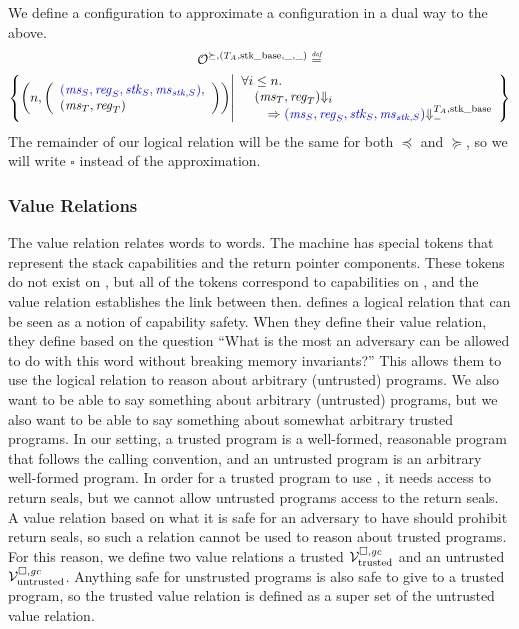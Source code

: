 \begin{jversion}
We define a \trgcm{} configuration to approximate a \srccm{} configuration in a dual way to the above.
\begin{multline*}
  \lro[\succeq,(\ta,\stkb,\_,\_)] \defeq \\\left\{ \npair{\left(\array{l}\src{(\ms_S,\reg_S,\stk_S,\ms_{\stk,S})},\\(\ms_T,\reg_T)\endarray\right)} \middle|
    \begin{array}{l}
      \forall i \leq n \ldotp \\ 
      \quad (\ms_T ,\reg_T) \term[i] \\\qquad\Rightarrow \src{(\ms_S,\reg_S,\stk_S,\ms_{\stk,S})} \sterm{\ta,\stkb}
    \end{array}
\right\}
\end{multline*}
The remainder of our logical relation will be the same for both $\preceq$ and $\succeq$, so we will write $\square$ instead of the approximation.

\subsubsection{Value Relations}
The value relation relates \trgcm{} words to \srccm{} words.
The \srccm{} machine has special tokens that represent the stack capabilities and the return pointer components.
These tokens do not exist on \trgcm{}, but all of the tokens correspond to capabilities on \trgcm{}, and the value relation establishes the link between then.
\citet{skorstengaard_reasoning_2017} defines a logical relation that can be seen as a notion of capability safety.
When they define their value relation, they define based on the question ``What is the most an adversary can be allowed to do with this word without breaking memory invariants?''
This allows them to use the logical relation to reason about arbitrary (untrusted) programs.
We also want to be able to say something about arbitrary (untrusted) programs, but we also want to be able to say something about somewhat arbitrary trusted programs.
In our setting, a trusted program is a well-formed, reasonable program that follows the \stktokens{} calling convention, and an untrusted program is an arbitrary well-formed program.
In order for a trusted program to use \stktokens{}, it needs access to return seals, but we cannot allow untrusted programs access to the return seals.
A value relation based on what it is safe for an adversary to have should prohibit return seals, so such a relation cannot be used to reason about trusted programs.
For this reason, we define two value relations a trusted $\mathcal{V}^{\square,\mathit{gc}}_{\mathrm{trusted}}$ and an untrusted $\mathcal{V}^{\square,\mathit{gc}}_{\mathrm{untrusted}}$.
Anything safe for unstrusted programs is also safe to give to a trusted program, so the trusted value relation is defined as a super set of the untrusted value relation.


\end{jversion}
